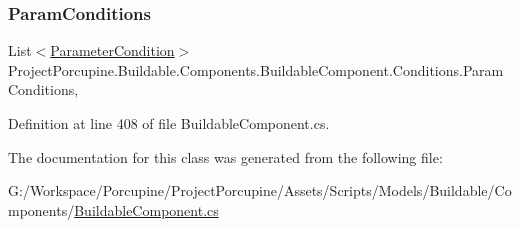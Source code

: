 \subsubsection{\texorpdfstring{Param\+Conditions}{ParamConditions}}
{\footnotesize\ttfamily List$<$\hyperlink{class_project_porcupine_1_1_buildable_1_1_components_1_1_buildable_component_1_1_parameter_condition}{Parameter\+Condition}$>$ Project\+Porcupine.\+Buildable.\+Components.\+Buildable\+Component.\+Conditions.\+Param\+Conditions\hspace{0.3cm}{\ttfamily [get]}, {\ttfamily [set]}}



Definition at line 408 of file Buildable\+Component.\+cs.



The documentation for this class was generated from the following file\+:\begin{DoxyCompactItemize}
\item 
G\+:/\+Workspace/\+Porcupine/\+Project\+Porcupine/\+Assets/\+Scripts/\+Models/\+Buildable/\+Components/\hyperlink{_buildable_component_8cs}{Buildable\+Component.\+cs}\end{DoxyCompactItemize}
